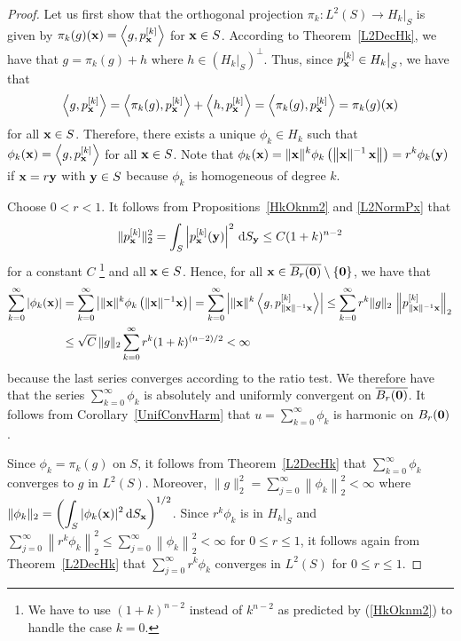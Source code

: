 \begin{proof}
Let us first show that the orthogonal projection
$\displaystyle \pi_k:L^2(S) \to H_k\big|_S$ is
given by $\displaystyle \pi_k(g)(\mathbf{x}) = \left\langle{g} , {p_{\mathbf{x}}^{[k]}}\right\rangle$
for $\mathbf{x} \in S$.
According to Theorem~\ref{L2DecHk}, we have that $g = \pi_k(g) + h$
where $\displaystyle h \in \left(H_k\big|_S\right)^\perp$.  Thus, since
$\displaystyle p_{\mathbf{x}}^{[k]} \in H_k\big|_S$, we have that
\[
\left\langle{g} , {p_{\mathbf{x}}^{[k]}}\right\rangle = \left\langle{\pi_k(g)} , {p_{\mathbf{x}}^{[k]}}\right\rangle
+ \left\langle{h} , {p_{\mathbf{x}}^{[k]}}\right\rangle
= \left\langle{\pi_k(g)} , {p_{\mathbf{x}}^{[k]}}\right\rangle = \pi_k(g)(\mathbf{x})
\]
for all $\mathbf{x} \in S$.  Therefore, there exists a unique
$\phi_k \in H_k$ such that
$\displaystyle \phi_k(\mathbf{x}) = \left\langle{g} , {p_{\mathbf{x}}^{[k]}}\right\rangle$
for all $\mathbf{x} \in S$.  Note that
$\displaystyle \phi_k(\mathbf{x})
= \|\mathbf{x}\|^k \phi_k\left(\left\|\mathbf{x}\|^{-1} \, \mathbf{x}\right\|\right)
= r^k \phi_k(\mathbf{y})$ if $\mathbf{x} = r \mathbf{y}$ with $\mathbf{y} \in S$
because $\phi_k$ is homogeneous of degree $k$.

 Choose $0 < r < 1$.  It follows from Propositions~\ref{HkOknm2} and
\ref{L2NormPx} that
\[
\|p_{\mathbf{x}}^{[k]}\|_2^2
= \int_S \left|p_{\mathbf{x}}^{[k]}(\mathbf{y})\right|^2 \,\mathrm{d}{S}_{\mathbf{y}}
\leq C (1+k)^{n-2}
\]
for a constant $C$ \footnote{We have to use $(1+k)^{n-2}$ instead of
$k^{n-2}$ as predicted by (\ref{HkOknm2}) to handle the case $k=0$.}
and all $\mathbf{x} \in S$.  Hence, for all
$\mathbf{x} \in \overline{B_r(\mathbf{0})} \setminus\{\mathbf{0}\}$,
we have that
\begin{align*}
\sum_{k=0}^\infty \left| \phi_k(\mathbf{x}) \right|
&= \sum_{k=0}^\infty \left| \|\mathbf{x}\|^k
\phi_k\left( \|\mathbf{x}\|^{-1}\mathbf{x}\right) \right|
=\sum_{k=0}^\infty \left| \|\mathbf{x}\|^k
\left\langle{g} , {p_{\|\mathbf{x}\|^{-1}\mathbf{x}}^{[k]}}\right\rangle \right|
\leq \sum_{k=0}^\infty r^k \|g\|_2\,
\left\|p_{\|\mathbf{x}\|^{-1}\mathbf{x}}^{[k]}\right\|_2 \\
&\leq \sqrt{C} \, \|g\|_2 \sum_{k=0}^\infty r^k (1+k)^{(n-2)/2}  < \infty
\end{align*}
because the last series converges according to the ratio test.
We therefore have that the series 
$\displaystyle \sum_{k=0}^\infty \phi_k$ is absolutely and uniformly
convergent on $\overline{B_r(\mathbf{0})}$.  It follows from
Corollary~\ref{UnifConvHarm} that
$\displaystyle u = \sum_{k=0}^\infty \phi_k$ is
harmonic on $B_r(\mathbf{0})$.

 Since $\displaystyle \phi_k = \pi_k(g)$ on $S$, it follows
from Theorem~\ref{L2DecHk} that
$\displaystyle \sum_{k=0}^\infty \phi_k$ converges to $g$ in
$\displaystyle L^2(S)$.  Moreover,
$\displaystyle \|g\|_2^2 = \sum_{j=0}^\infty \left\|\phi_k\right\|_2^2 < \infty$
where $\displaystyle \|\phi_k\|_2
= \left( \int_S |\phi_k(\mathbf{x})|^2 \,\mathrm{d}{S}_{\mathbf{x}}\right)^{1/2}$.
Since $\displaystyle r^k\phi_k$ is in $\displaystyle H_k\big|_S$ and
$\displaystyle \sum_{j=0}^\infty \left\|r^k\phi_k\right\|_2^2
\leq \sum_{j=0}^\infty \left\|\phi_k\right\|_2^2 < \infty$ for
$0 \leq r \leq 1$, it follows again from Theorem~\ref{L2DecHk} that
$\displaystyle \sum_{j=0}^\infty r^k\phi_k$ converges in $\displaystyle L^2(S)$
for $0 \leq r \leq 1$.


\end{proof}
